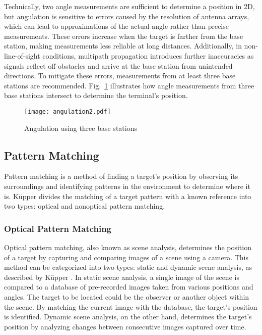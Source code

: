Technically, two angle measurements are sufficient to determine a position in 2D, but angulation is sensitive to errors caused by the resolution of antenna arrays, which can lead to approximations of the actual angle rather than precise measurements.
These errors increase when the target is farther from the base station, making measurements less reliable at long distances.
Additionally, in non-line-of-sight conditions, multipath propagation introduces further inaccuracies as signals reflect off obstacles and arrive at the base station from unintended directions. 
To mitigate these errors, measurements from at least three base stations are recommended.
Fig.~\ref{fig:angulation2} illustrates how angle measurements from three base stations intersect to determine the terminal's position.

\begin{figure}[htbp]
    \centering
    \texttt{[image: angulation2.pdf]}
    \caption{Angulation using three base stations \cite{militaru2024positioning}}
    \label{fig:angulation2}
\end{figure}

\subsection{Pattern Matching}
Pattern matching is a method of finding a target's position by observing its surroundings and identifying patterns in the environment to determine where it is.
K\"upper \cite{kupper2005location} divides the matching of a target pattern with a known reference into two types: optical and nonoptical pattern matching.

\subsubsection{Optical Pattern Matching}
Optical pattern matching, also known as scene analysis, determines the position of a target by capturing and comparing images of a scene using a camera.
This method can be categorized into two types: static and dynamic scene analysis, as described by Küpper \cite{kupper2005location}.
In static scene analysis, a single image of the scene is compared to a database of pre-recorded images taken from various positions and angles. 
The target to be located could be the observer or another object within the scene. 
By matching the current image with the database, the target's position is identified.
Dynamic scene analysis, on the other hand, determines the target's position by analyzing changes between consecutive images captured over time. 

